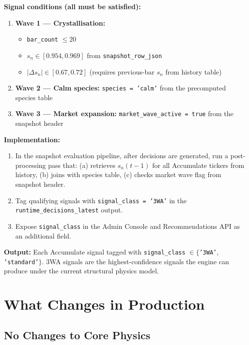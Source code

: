 \documentclass[11pt, a4paper]{article}
\theoremstyle{definition}
\begin{document}
\textbf{Signal conditions (all must be satisfied):}
\begin{enumerate}
  \item \textbf{Wave 1 — Crystallisation:}
        \begin{itemize}
          \item \texttt{bar\_count} $\leq 20$
          \item $s_n \in [0.954, 0.969]$ from \texttt{snapshot\_row\_json}
          \item $|\Delta s_n| \in [0.67, 0.72]$ (requires previous-bar $s_n$
                from history table)
        \end{itemize}
  \item \textbf{Wave 2 — Calm species:}
        \texttt{species = 'calm'} from the precomputed species table
  \item \textbf{Wave 3 — Market expansion:}
        \texttt{market\_wave\_active = true} from the snapshot header
\end{enumerate}

\textbf{Implementation:}
\begin{enumerate}
  \item In the snapshot evaluation pipeline, after decisions are generated,
        run a post-processing pass that:
        (a) retrieves $s_n(t-1)$ for all Accumulate tickers from history,
        (b) joins with species table,
        (c) checks market wave flag from snapshot header.
  \item Tag qualifying signals with \texttt{signal\_class = '3WA'} in the
        \texttt{runtime\_decisions\_latest} output.
  \item Expose \texttt{signal\_class} in the Admin Console and
        Recommendations API as an additional field.
\end{enumerate}

\textbf{Output:} Each Accumulate signal tagged with
\texttt{signal\_class} $\in \{$\texttt{'3WA'}, \texttt{'standard'}$\}$.
3WA signals are the highest-confidence signals the engine can produce
under the current structural physics model.

\section{What Changes in Production}

\subsection{No Changes to Core Physics}
\end{document}
